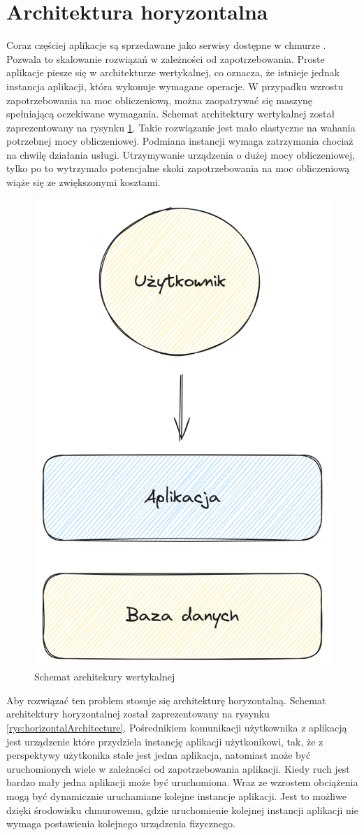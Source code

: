 \section{Architektura horyzontalna}

Coraz częściej aplikacje są sprzedawane jako serwisy dostępne w chmurze \cite{horizontalArchitecture}.
Pozwala to skalowanie rozwiązań w zależności od zapotrzebowania.
Proste aplikacje piesze się w architekturze wertykalnej, co oznacza, że istnieje jednak instancja aplikacji, która wykonuje wymagane operacje.
W przypadku wzrostu zapotrzebowania na moc obliczeniową, można zaopatrywać się maszynę spełniającą oczekiwane wymagania.
Schemat architektury wertykalnej został zaprezentowany na rysynku \ref{rys:veriticalArchitecture}.
Takie rozwiązanie jest mało elastyczne na wahania potrzebnej mocy obliczeniowej.
Podmiana instancji wymaga zatrzymania chociaż na chwilę działania usługi.
Utrzymywanie urządzenia o dużej mocy obliczeniowej, tylko po to wytrzymało potencjalne skoki zapotrzebowania na moc obliczeniową wiąże się ze zwiększonymi kosztami.

\begin{figure}[!hb]
	\centering \includegraphics[width=0.5\linewidth]{rysunki/vertical_archtecture.png}
	\caption{Schemat architekury wertykalnej}
	\label{rys:veriticalArchitecture}
\end{figure}


Aby rozwiązać ten problem stosuje się architekturę horyzontalną.
Schemat architektury horyzontalnej został zaprezentowany na rysynku \ref{rys:horizontalArchitecture}.
Pośrednikiem komunikacji użytkownika z aplikacją jest urządzenie które przydziela instancję aplikacji użytkonikowi, tak, że z perspektywy użytkonika stale jest jedna aplikacja, natomiast może być uruchomionych wiele w zależności od zapotrzebowania aplikacji.
Kiedy ruch jest bardzo mały jedna aplikacji może być uruchomiona.
Wraz ze wzrostem obciążenia mogą być dynamicznie uruchamiane kolejne instancje aplikacji.
Jest to możliwe dzięki środowisku chmurowemu, gdzie uruchomienie kolejnej instancji aplikacji nie wymaga postawienia kolejnego urządzenia fizycznego.

